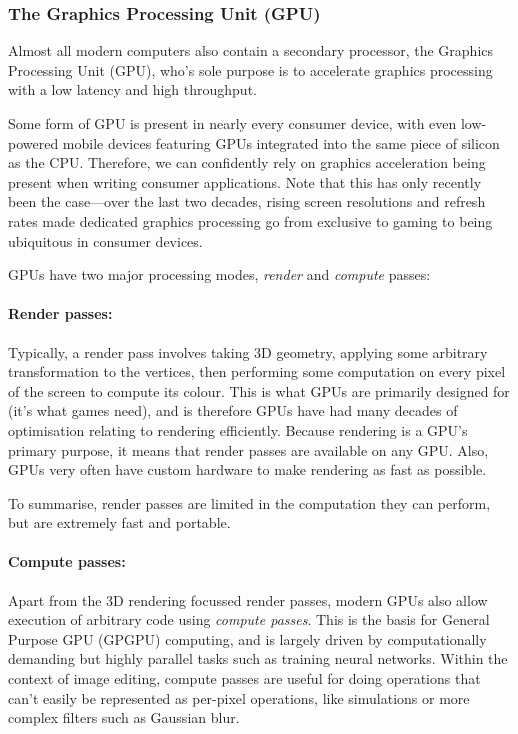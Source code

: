 \documentclass[12pt]{article}
\begin{document}
\subsubsection{The Graphics Processing Unit (GPU)}\label{sec:gpu}

Almost all modern computers also contain a secondary processor, the Graphics Processing Unit (GPU),
who's sole purpose is to accelerate graphics processing with a low latency and high throughput.

Some form of GPU is present in nearly every consumer device, with even low-powered mobile devices
featuring GPUs integrated into the same piece of silicon as the CPU.  Therefore, we can confidently
rely on graphics acceleration being present when writing consumer applications.  Note that this has
only recently been the case---over the last two decades, rising screen resolutions and refresh
rates made dedicated graphics processing go from exclusive to gaming to being ubiquitous in consumer
devices.

GPUs have two major processing modes, \emph{render} and \emph{compute} passes:

\paragraph{Render passes:} Typically, a render pass involves taking 3D geometry, applying some
arbitrary transformation to the vertices, then performing some computation on every pixel of the
screen to compute its colour.  This is what GPUs are primarily designed for (it's what games need),
and is therefore GPUs have had many decades of optimisation relating to rendering efficiently.
Because rendering is a GPU's primary purpose, it means that render passes are available on any GPU.
Also, GPUs very often have custom hardware to make rendering as fast as possible.

To summarise, render passes are limited in the computation they can perform, but are extremely fast
and portable.  

\paragraph{Compute passes:} Apart from the 3D rendering focussed render passes, modern GPUs also
allow execution of arbitrary code using \emph{compute passes}.  This is the basis for General
Purpose GPU (GPGPU) computing, and is largely driven by computationally demanding but highly
parallel tasks such as training neural networks.  Within the context of image editing, compute
passes are useful for doing operations that can't easily be represented as per-pixel operations,
like simulations or more complex filters such as Gaussian blur.
\end{document}
